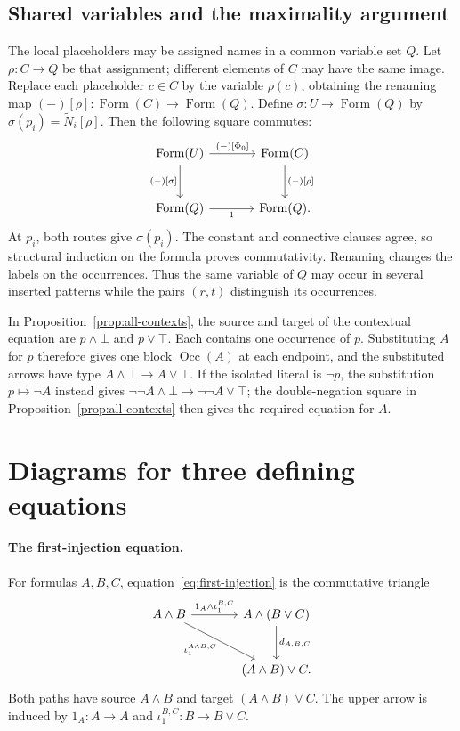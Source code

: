 \documentclass[11pt]{article}
\newcommand{\Occ}{\operatorname{Occ}}
\newcommand{\FormulaSet}{\operatorname{Form}}
\begin{document}
\subsection{Shared variables and the maximality argument}\label{app:shared}

The local placeholders may be assigned names in a common variable
set $Q$. Let $\rho:C\to Q$ be that assignment; different elements
of $C$ may have the same image. Replace each placeholder $c\in C$
by the variable $\rho(c)$, obtaining the renaming map
$(-)[\rho]:\FormulaSet(C)\to\FormulaSet(Q)$. Define
$\sigma:U\to\FormulaSet(Q)$ by
$\sigma(p_i)=\widetilde N_i[\rho]$.
Then the following square commutes:
\begin{equation}\label{eq:app-renaming}
\begin{tikzcd}[column sep=large,row sep=large]
 \FormulaSet(U)\arrow[r,"{(-)[\Phi_0]}"]
    \arrow[d,"{(-)[\sigma]}"']
   &\FormulaSet(C)\arrow[d,"{(-)[\rho]}"]\\
 \FormulaSet(Q)\arrow[r,"1"']&\FormulaSet(Q).
\end{tikzcd}
\end{equation}
At $p_i$, both routes give $\sigma(p_i)$. The constant and connective
clauses agree, so structural induction on the formula proves commutativity.
Renaming changes the labels on the occurrences. Thus the same variable
of $Q$ may occur in several inserted patterns while the pairs $(r,t)$
distinguish its occurrences.

In Proposition~\ref{prop:all-contexts}, the source and target of
the contextual equation are $p\wedge\bot$ and $p\vee\top$.
Each contains one occurrence of $p$. Substituting $A$ for $p$
therefore gives one block $\Occ(A)$ at each endpoint, and the
substituted arrows have type $A\wedge\bot\to A\vee\top$. If the isolated literal is $\neg p$,
the substitution $p\mapsto\neg A$ instead gives
$\neg\neg A\wedge\bot\to\neg\neg A\vee\top$; the
double-negation square in Proposition~\ref{prop:all-contexts}
then gives the required equation for $A$.

\section{Diagrams for three defining equations}
\label{app:structural-diagrams}

\paragraph{The first-injection equation.}
For formulas $A,B,C$, equation~\eqref{eq:first-injection} is the
commutative triangle
\[
\begin{tikzcd}[column sep=large,row sep=large]
 A\wedge B
   \arrow[r,"1_A\wedge\iota_1^{B,C}"]
   \arrow[dr,"{\iota_1^{A\wedge B,C}}"']
   &A\wedge(B\vee C)\arrow[d,"d_{A,B,C}"]\\
   &(A\wedge B)\vee C.
\end{tikzcd}
\]
Both paths have source $A\wedge B$ and target $(A\wedge B)\vee C$.
The upper arrow is induced by $1_A:A\to A$ and
$\iota_1^{B,C}:B\to B\vee C$.
\end{document}
